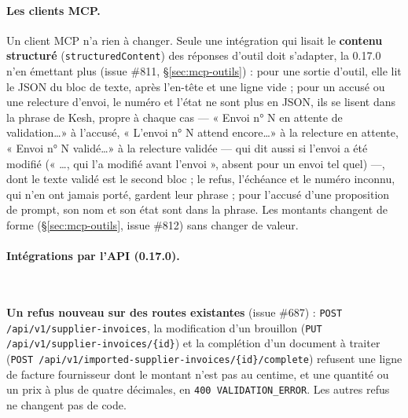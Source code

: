 \documentclass[a4paper,11pt,oneside]{article}
\begin{document}
\paragraph{Les clients MCP.} Un client MCP n'a rien à changer. Seule une intégration qui lisait le \textbf{contenu structuré} (\texttt{structuredContent}) des réponses d'outil doit s'adapter, la 0.17.0 n'en émettant plus (issue \#811, \S\ref{sec:mcp-outils}) : pour une sortie d'outil, elle lit le JSON du bloc de texte, après l'en-tête et une ligne vide ; pour un accusé ou une relecture d'envoi, le numéro et l'état ne sont plus en JSON, ils se lisent dans la phrase de Kesh, propre à chaque cas --- « Envoi n° N en attente de validation\ldots » à l'accusé, « L'envoi n° N attend encore\ldots » à la relecture en attente, « Envoi n° N validé\ldots » à la relecture validée --- qui dit aussi si l'envoi a été modifié (« \ldots, qui l'a modifié avant l'envoi », absent pour un envoi tel quel) ---, dont le texte validé est le second bloc ; le refus, l'échéance et le numéro inconnu, qui n'en ont jamais porté, gardent leur phrase ; pour l'accusé d'une proposition de prompt, son nom et son état sont dans la phrase. Les montants changent de forme (\S\ref{sec:mcp-outils}, issue \#812) sans changer de valeur.

\paragraph{Intégrations par l'API (0.17.0).}\mbox{}\\
\begin{sloppypar}
\textbf{Un refus nouveau sur des routes existantes} (issue \#687) : \texttt{POST /api/v1/supplier-invoices}, la modification d'un brouillon (\texttt{PUT /api/v1/supplier-invoices/\{id\}}) et la complétion d'un document à traiter (\texttt{POST /api/v1/imported-supplier-invoices/\{id\}/complete}) refusent une ligne de facture fournisseur dont le montant n'est pas au centime, et une quantité ou un prix à plus de quatre décimales, en \texttt{400 VALIDATION\_ERROR}. Les autres refus ne changent pas de code.
\end{sloppypar}
\end{document}
